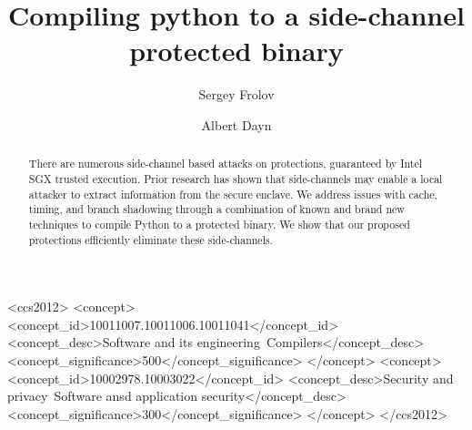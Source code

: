 \documentclass[sigplan, review]{acmart}
\begin{document}
\title{Compiling python to a side-channel protected binary}

\author{Sergey Frolov}

\author{Albert Dayn}



\begin{abstract}
There are numerous side-channel based attacks on protections, guaranteed by Intel SGX trusted execution. Prior research has shown that side-channels may enable a local attacker to extract information from the secure enclave. We address issues with cache, timing, and branch shadowing through a combination of known and brand new techniques to compile Python to a protected binary. We show that our proposed protections efficiently eliminate these side-channels.
\end{abstract}

%
%
\begin{CCSXML}
<ccs2012>
<concept>
<concept_id>10011007.10011006.10011041</concept_id>
<concept_desc>Software and its engineering~Compilers</concept_desc>
<concept_significance>500</concept_significance>
</concept>
<concept>
<concept_id>10002978.10003022</concept_id>
<concept_desc>Security and privacy~Software ansd application security</concept_desc>
<concept_significance>300</concept_significance>
</concept>
</ccs2012>
\end{CCSXML}




\maketitle
\end{document}
